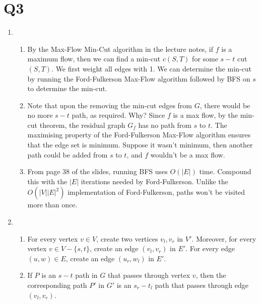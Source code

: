 \documentclass[12pt,a4paper]{article}
\begin{document}
\section*{Q3}
	\begin{enumerate}[label=(\alph*)]
		\item 
		\begin{enumerate}[label=(\roman*)]
			\item 
			By the Max-Flow Min-Cut algorithm in the lecture notes, if $f$ is a maximum flow, then we can find a min-cut $c(S, T)$ for some $s-t$ cut $(S, T)$. We first weight all edges with 1. We can determine the min-cut by running the Ford-Fulkerson Max-Flow algorithm followed by BFS on $s$ to determine the min-cut.
			
			\item Note that upon the removing the min-cut edges from $G$, there would be no more $s-t$ path, as required. Why? Since $f$ is a max flow, by the min-cut theorem, the residual graph $G_f$ has no path from $s$ to $t$. The maximising property of the Ford-Fulkerson Max-Flow algorithm ensures that the edge set is minimum. Suppose it wasn't minimum, then another path could be added from $s$ to $t$, and $f$ wouldn't be a max flow.
			
			\item From page 38 of the slides, running BFS uses $O(|E|)$ time. Compound this with the $|E|$ iterations needed by Ford-Fulkerson. Unlike the $O(|V||E|^2)$ implementation of Ford-Fulkerson, paths won't be visited more than once.
		\end{enumerate}

		\item 
		\begin{enumerate}[label=(\roman*)]
			\item 
			For every vertex $v \in V$, create two vertices $v_l, v_r$ in $V'$. Moreover, for every vertex $v \in V - \{s, t\}$, create an edge $(v_l, v_r)$ in $E'$. For every edge $(u, w) \in E$, create an edge $(u_r, w_l)$ in $E'$.

			\item
			If $P$ is an $s-t$ path in $G$ that passes through vertex $v$, then the corresponding path $P'$ in $G'$ is an $s_r - t_l$ path that passes through edge $(v_l, v_r)$.
		\end{enumerate}

	\end{enumerate}

\newpage
\end{document}
